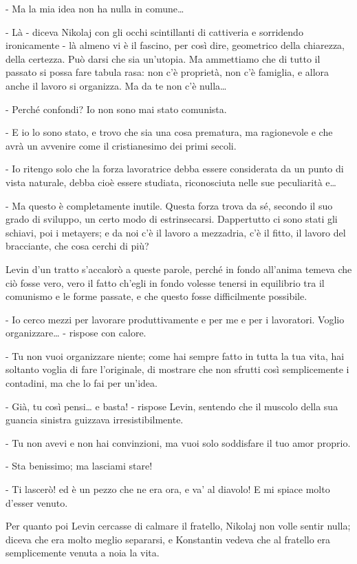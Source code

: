 - Ma la mia idea non ha nulla in comune\ldots{} 

- Là - diceva Nikolaj con gli occhi scintillanti di cattiveria e sorridendo ironicamente - là almeno vi è il fascino, per così dire, geometrico della chiarezza, della certezza. Può darsi che sia un'utopia. Ma ammettiamo che di tutto il passato si possa fare tabula rasa: non c'è proprietà, non c'è famiglia, e allora anche il lavoro si organizza. Ma da te non c'è nulla\ldots{} 

- Perché confondi? Io non sono mai stato comunista. 

- E io lo sono stato, e trovo che sia una cosa prematura, ma ragionevole e che avrà un avvenire come il cristianesimo dei primi secoli. 

- Io ritengo solo che la forza lavoratrice debba essere considerata da un punto di vista naturale, debba cioè essere studiata, riconosciuta nelle sue peculiarità e\ldots{} 

- Ma questo è completamente inutile. Questa forza trova da sé, secondo il suo grado di sviluppo, un certo modo di estrinsecarsi. Dappertutto ci sono stati gli schiavi, poi i metayers; e da noi c'è il lavoro a mezzadria, c'è il fitto, il lavoro del bracciante, che cosa cerchi di più? 

Levin d'un tratto s'accalorò a queste parole, perché in fondo all'anima temeva che ciò fosse vero, vero il fatto ch'egli in fondo volesse tenersi in equilibrio tra il comunismo e le forme passate, e che questo fosse difficilmente possibile. 

- Io cerco mezzi per lavorare produttivamente e per me e per i lavoratori. Voglio organizzare\ldots{} - rispose con calore. 

- Tu non vuoi organizzare niente; come hai sempre fatto in tutta la tua vita, hai soltanto voglia di fare l'originale, di mostrare che non sfrutti così semplicemente i contadini, ma che lo fai per un'idea. 

- Già, tu così pensi\ldots{} e basta! - rispose Levin, sentendo che il muscolo della sua guancia sinistra guizzava irresistibilmente. 

- Tu non avevi e non hai convinzioni, ma vuoi solo soddisfare il tuo amor proprio. 

- Sta benissimo; ma lasciami stare! 

- Ti lascerò! ed è un pezzo che ne era ora, e va' al diavolo! E mi spiace molto d'esser venuto. 

Per quanto poi Levin cercasse di calmare il fratello, Nikolaj non volle sentir nulla; diceva che era molto meglio separarsi, e Konstantin vedeva che al fratello era semplicemente venuta a noia la vita. 

